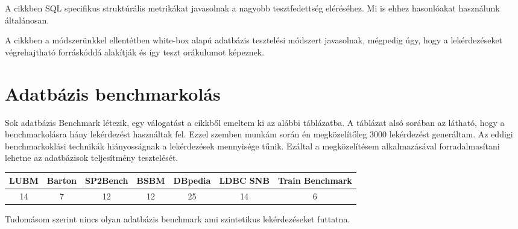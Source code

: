 A \cite{SuarezCabal} cikkben SQL specifikus struktúrális metrikákat javasolnak a nagyobb tesztfedettség eléréséhez. Mi is ehhez hasonlóakat használunk általánosan.

A \cite{DBLP} cikkben a módszerünkkel ellentétben white-box alapú adatbázis tesztelési módszert javasolnak, mégpedig úgy, hogy a lekérdezéseket végrehajtható forráskóddá alakítják és így teszt orákulumot képeznek.



\section{Adatbázis benchmarkolás}
Sok adatbázis Benchmark létezik, egy válogatást a \cite{szarnyas2018train} cikkből emeltem ki az alábbi táblázatba. A táblázat alsó sorában az látható, hogy a benchmarkolásra hány lekérdezést használtak fel. Ezzel szemben munkám során én megközelítőleg 3000 lekérdezést generáltam. Az eddigi benchmarkoklási technikák hiányosságnak a lekérdezések mennyisége tűnik.  Ezáltal a megközelítésem alkalmazásával forradalmasítani lehetne az adatbázisok teljesítmény tesztelését. 

\begin{center}
	\begin{tabular}{ c | c | c | c | c | c | c }
 LUBM & Barton & SP2Bench & 	BSBM & DBpedia & LDBC SNB &	Train Benchmark \\\hline
 14 & 7 & 12 & 12 &	25 & 14 & 	6 \\
	\end{tabular}
\end{center}


Tudomásom szerint nincs olyan adatbázis benchmark ami szintetikus lekérdezéseket futtatna.